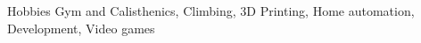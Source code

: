 

\begin{cvskills}

  \cvskill
    {Hobbies} %
    {Gym and Calisthenics, Climbing, 3D Printing, Home automation, Development, Video games} %

\end{cvskills}
